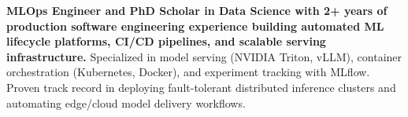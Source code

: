 \documentclass[../main.tex]{subfiles}
\begin{document}
\textbf{MLOps Engineer and PhD Scholar in Data Science with 2+ years of production software engineering experience building automated ML lifecycle platforms, CI/CD pipelines, and scalable serving infrastructure.}
Specialized in model serving (NVIDIA Triton, vLLM), container orchestration (Kubernetes, Docker), and experiment tracking with MLflow.
Proven track record in deploying fault-tolerant distributed inference clusters and automating edge/cloud model delivery workflows.
\end{document}
